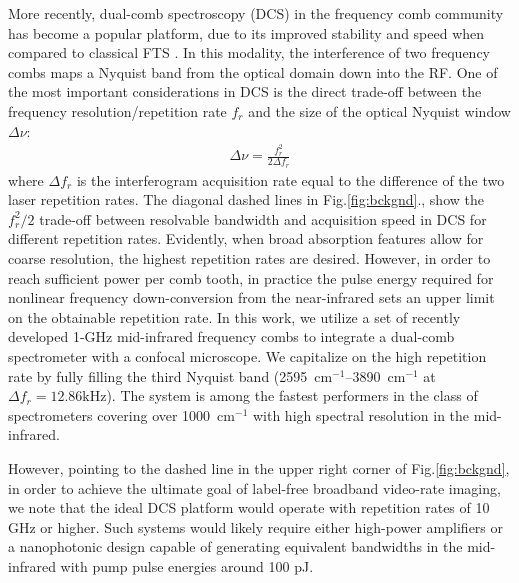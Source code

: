 \documentclass{optica-article}
\begin{document}
More recently, dual-comb spectroscopy (DCS) in the frequency comb community has become a popular platform, due to its improved stability and speed when compared to classical FTS \cite{coddington_dual-comb_2016}. In this modality, the interference of two frequency combs maps a Nyquist band from the optical domain down into the RF. One of the most important considerations in DCS is the direct trade-off between the frequency resolution/repetition rate $f_r$ and the size of the optical Nyquist window $\Delta \nu$:
% 
\begin{align}
    \Delta \nu = \frac{f_r^2}{2 \Delta f_r}
\end{align}
% 
where $\Delta f_r$ is the interferogram acquisition rate equal to the difference of the two laser repetition rates. The diagonal dashed lines in \mbox{Fig.\ref{fig:bckgnd}}., show the $f_r^2/2$ trade-off between resolvable bandwidth and acquisition speed in DCS for different repetition rates. Evidently, when broad absorption features allow for coarse resolution, the highest repetition rates are desired. However, in order to reach sufficient power per comb tooth, in practice the pulse energy required for nonlinear frequency down-conversion from the near-infrared sets an upper limit on the obtainable repetition rate. In this work, we utilize a set of recently developed 1-GHz mid-infrared frequency combs \cite{hoghooghi_broadband_2022} to integrate a dual-comb spectrometer with a confocal microscope. We capitalize on the high repetition rate by fully filling the third Nyquist band (\mbox{2595 $\mathrm{cm^{-1}}$}--\mbox{3890 $\mathrm{cm^{-1}}$} at \mbox{$\Delta f_r=12.86\text{kHz}$}). The system is among the fastest performers in the class of spectrometers covering over \mbox{1000 $\mathrm{cm^{-1}}$} with high spectral resolution in the mid-infrared.

However, pointing to the dashed line in the upper right corner of \mbox{Fig.\ref{fig:bckgnd}}, in order to achieve the ultimate goal of label-free broadband video-rate imaging, we note that the ideal DCS platform would operate with repetition rates of 10 GHz or higher. Such systems would likely require either high-power amplifiers or a nanophotonic design capable of generating equivalent bandwidths in the mid-infrared with pump pulse energies around 100 pJ.


\end{document}
